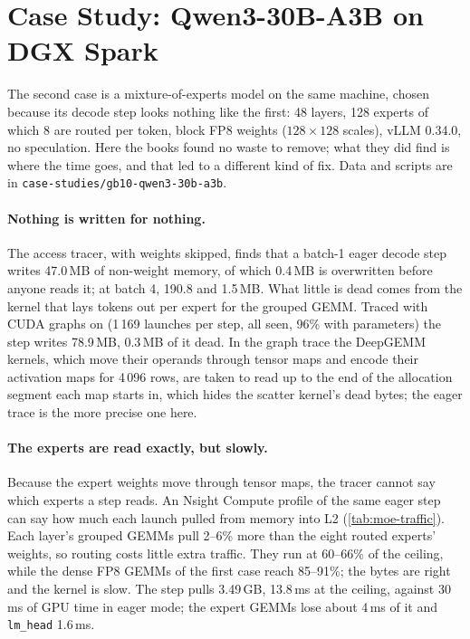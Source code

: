 \section{Case Study: Qwen3-30B-A3B on DGX Spark}\label{sec:case2}

The second case is a mixture-of-experts model on the same machine, chosen because its decode step
looks nothing like the first: 48 layers, 128 experts of which 8 are routed per token, block FP8
weights ($128\times128$ scales), vLLM 0.34.0, no speculation. Here the books found no waste to
remove; what they did find is where the time goes, and that led to a different kind of fix.
Data and scripts are in \texttt{case-studies/gb10-qwen3-30b-a3b}.

\paragraph{Nothing is written for nothing.}
The access tracer, with weights skipped, finds that a batch-1 eager decode step writes 47.0\,MB of
non-weight memory, of which 0.4\,MB is overwritten before anyone reads it; at batch 4, 190.8 and
1.5\,MB. What little is dead comes from the kernel that lays tokens out per expert for the grouped
GEMM. Traced with CUDA graphs on (1\,169 launches per step, all seen, 96\% with parameters) the step
writes 78.9\,MB, 0.3\,MB of it dead. In the graph trace the DeepGEMM kernels, which move their
operands through tensor maps and encode their activation maps for 4\,096 rows, are taken to read up
to the end of the allocation segment each map starts in, which hides the scatter kernel's dead
bytes; the eager trace is the more precise one here.

\paragraph{The experts are read exactly, but slowly.}
Because the expert weights move through tensor maps, the tracer cannot say which experts a step
reads. An Nsight Compute profile of the same eager step can say how much each launch pulled from
memory into L2 (\cref{tab:moe-traffic}). Each layer's grouped GEMMs pull 2--6\% more than the eight
routed experts' weights, so routing costs little extra traffic. They run at 60--66\% of
the ceiling, while the dense FP8 GEMMs of the first case reach 85--91\%; the bytes are right and
the kernel is slow. The step pulls 3.49\,GB, 13.8\,ms at the ceiling, against 30\,ms of GPU time
in eager mode; the expert GEMMs lose about 4\,ms of it and \texttt{lm\_head} 1.6\,ms.

